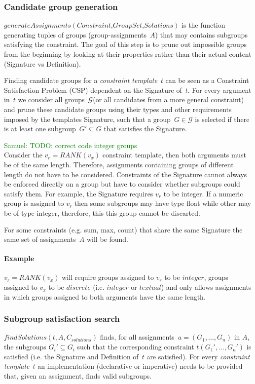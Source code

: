 \documentclass{sig-alternate-05-2015}
\newcommand{\samuel}[1]{\textcolor{green}{{\sc Samuel:} #1}\xspace}
\newcommand{\format}[1]{\textit{#1}\xspace}
\newcommand{\generategroups}{\format{generateAssignments}}
\newcommand{\findassignment}{\format{findSolutions}}
\newcommand{\template}{\format{constraint template}}
\newcommand{\CSignature}{Signature\xspace}
\newcommand{\CFunction}{Definition\xspace}
\newcommand{\groups}{\ensuremath{\mathcal{G}}\xspace}
\newcommand{\eccalc}[2]{\ensuremath{#1 = #2}}
\newcommand{\ecrank}[2]{\eccalc{#1}{\mathit{RANK}(#2)}}
\newcommand{\textual}{\format{textual}}
\newcommand{\integer}{\format{integer}}
\newcommand{\discrete}{\format{discrete}}
\begin{document}
\subsubsection{Candidate group generation}
$\generategroups(\textit{Constraint,GroupSet,Solutions})$ is the function generating tuples of groups (group-assignments~$A$) that may contains subgroups satisfying the constraint.
The goal of this step is to prune out impossible groups from the beginning by looking at their properties rather than their actual content (\CSignature vs \CFunction).

Finding candidate groups for a \template~$t$ can be seen as a Constraint Satisfaction Problem (CSP) dependent on the \CSignature of~$t$.
For every argument in~$t$ we consider all groups~\groups (or all candidates from a more general constraint) and prune these candidate groups using their types and other requirements imposed by the templates \CSignature, such that a group~$G \in \groups$ is selected if there is at least one subgroup~$G' \subseteq G$ that satisfies the \CSignature.

\samuel{TODO: correct code integer groups}\\
Consider the \ecrank{v_r}{v_x} constraint template, then both arguments must be of the same length.
Therefore, assignments containing groups of different length do not have to be considered.
Constraints of the \CSignature cannot always be enforced directly on a group but have to consider whether subgroups could satisfy them.
For example, the \CSignature requires $v_r$ to be integer.
If a numeric group is assigned to $v_r$ then some subgroups may have type float while other may be of type integer, therefore, this this group cannot be discarted.

For some constraints (e.g. sum, max, count) that share the same \CSignature the same set of assignments~$A$ will be found.

\paragraph{Example}
\ecrank{v_r}{v_x} will require groups assigned to $v_r$ to be $\integer$, groups assigned to $v_x$ to be $\discrete$ (i.e. $\integer$ or $\textual$) and only allows assignments in which groups assigned to both arguments have the same length.

\subsubsection{Subgroup satisfaction search}
$\findassignment(t,A,C_{solutions})$ finds, for all assignments~$a = (G_1, ..., G_n)$ in $A$, the subgroups $G_i' \subseteq G_i$ such that the corresponding constraint $t(G_1', ..., G_n')$ is satisfied (i.e. the \CSignature and \CFunction of~$t$ are satisfied).
For every \template~$t$ an implementation (declarative or imperative) needs to be provided that, given an assignment, finds valid subgroups.
\end{document}
